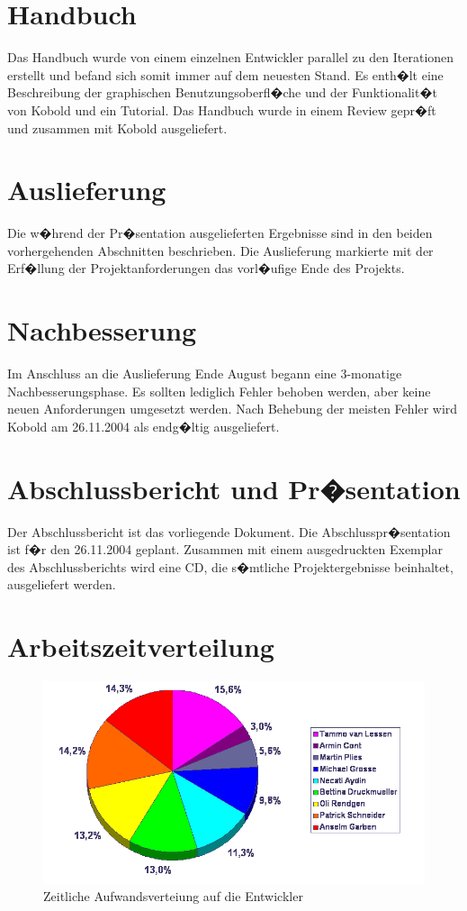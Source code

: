 \documentclass[a4paper,titlepage,12pt,ngerman]{scrbook}
\begin{document}
\section{Handbuch}
Das Handbuch wurde von einem einzelnen Entwickler parallel zu den Iterationen 
erstellt und befand sich somit immer auf dem neuesten Stand. Es enth�lt eine 
Beschreibung der graphischen Benutzungsoberfl�che und der Funktionalit�t 
von Kobold und ein Tutorial. Das Handbuch wurde in einem Review gepr�ft und
zusammen mit Kobold ausgeliefert.


\section{Auslieferung}
Die w�hrend der Pr�sentation ausgelieferten Ergebnisse sind in den
beiden vorhergehenden Abschnitten beschrieben. Die Auslieferung
markierte mit der Erf�llung der Projektanforderungen das vorl�ufige
Ende des Projekts.

\section{Nachbesserung}
Im Anschluss an die Auslieferung Ende August begann eine 3-monatige
Nachbesserungsphase. Es sollten lediglich Fehler behoben
werden, aber keine neuen Anforderungen umgesetzt werden. Nach Behebung der 
meisten Fehler wird Kobold am 26.11.2004 als endg�ltig ausgeliefert.


\section{Abschlussbericht und Pr�sentation}
Der Abschlussbericht ist das vorliegende Dokument. Die
Abschlusspr�sentation ist f�r den 26.11.2004 geplant. Zusammen
mit einem ausgedruckten Exemplar des Abschlussberichts wird eine CD, die
s�mtliche Projektergebnisse beinhaltet, ausgeliefert werden.


\section{Arbeitszeitverteilung}

\begin{figure}[h!]
  \centering
  \includegraphics[width=12.5cm]{praesentation/zeit_pro_entwickler}
  \caption{Zeitliche Aufwandsverteiung auf die Entwickler}
\end{figure}
\end{document}
